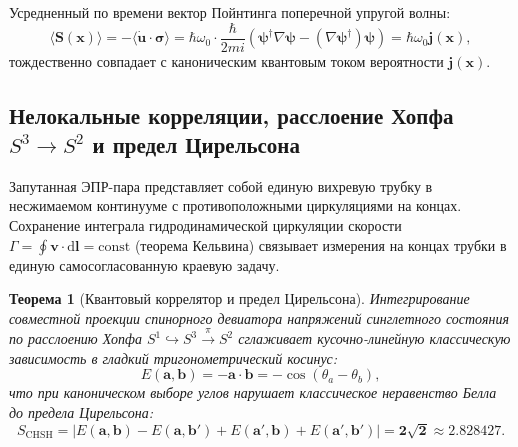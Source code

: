 \documentclass[11pt,a4paper]{article}
\newtheorem{theorem}{Теорема}[section]
\theoremstyle{definition}
\theoremstyle{remark}
\begin{document}
Усредненный по времени вектор Пойнтинга поперечной упругой волны:
\begin{equation}
    \langle \mathbf{S}(\mathbf{x}) \rangle = -\langle \dot{\mathbf{u}} \cdot \boldsymbol{\sigma} \rangle = \hbar \omega_0 \cdot \frac{\hbar}{2 m i} \left( \boldsymbol{\psi}^\dagger \nabla \boldsymbol{\psi} - (\nabla \boldsymbol{\psi}^\dagger) \boldsymbol{\psi} \right) = \hbar \omega_0 \mathbf{j}(\mathbf{x}),
\end{equation}
тождественно совпадает с каноническим квантовым током вероятности $\mathbf{j}(\mathbf{x})$.

\subsection{Нелокальные корреляции, расслоение Хопфа $S^3 \to S^2$ и предел Цирельсона}
Запутанная ЭПР-пара представляет собой единую вихревую трубку в несжимаемом континууме с противоположными циркуляциями на концах. Сохранение интеграла гидродинамической циркуляции скорости $\Gamma = \oint \mathbf{v}\cdot\mathrm{d}\mathbf{l} = \mathrm{const}$ (теорема Кельвина) связывает измерения на концах трубки в единую самосогласованную краевую задачу.

\begin{theorem}[Квантовый коррелятор и предел Цирельсона]
Интегрирование совместной проекции спинорного девиатора напряжений синглетного состояния по расслоению Хопфа $S^1 \hookrightarrow S^3 \xrightarrow{\pi} S^2$ сглаживает кусочно-линейную классическую зависимость в гладкий тригонометрический косинус:
\begin{equation}
    E(\mathbf{a}, \mathbf{b}) = -\mathbf{a} \cdot \mathbf{b} = -\cos(\theta_a - \theta_b),
    \label{eq:quantum_correlator_exact}
\end{equation}
что при каноническом выборе углов нарушает классическое неравенство Белла до предела Цирельсона:
\begin{equation}
    S_{\mathrm{CHSH}} = \left| E(\mathbf{a}, \mathbf{b}) - E(\mathbf{a}, \mathbf{b}') + E(\mathbf{a}', \mathbf{b}) + E(\mathbf{a}', \mathbf{b}') \right| = \mathbf{2\sqrt{2} \approx 2.828427}.
    \label{eq:tsirelson_exact_limit}
\end{equation}
\end{theorem}
\end{document}
